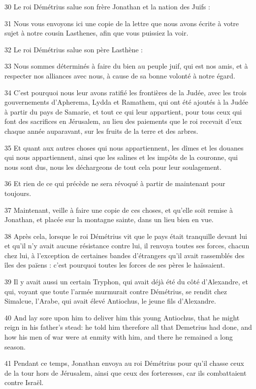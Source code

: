 \par 30 Le roi Démétrius salue son frère Jonathan et la nation des Juifs :
\par 31 Nous vous envoyons ici une copie de la lettre que nous avons écrite à votre sujet à notre cousin Lasthenes, afin que vous puissiez la voir.
\par 32 Le roi Démétrius salue son père Lasthène :
\par 33 Nous sommes déterminés à faire du bien au peuple juif, qui est nos amis, et à respecter nos alliances avec nous, à cause de sa bonne volonté à notre égard.
\par 34 C'est pourquoi nous leur avons ratifié les frontières de la Judée, avec les trois gouvernements d'Apherema, Lydda et Ramathem, qui ont été ajoutés à la Judée à partir du pays de Samarie, et tout ce qui leur appartient, pour tous ceux qui font des sacrifices en Jérusalem, au lieu des paiements que le roi recevait d'eux chaque année auparavant, sur les fruits de la terre et des arbres.
\par 35 Et quant aux autres choses qui nous appartiennent, les dîmes et les douanes qui nous appartiennent, ainsi que les salines et les impôts de la couronne, qui nous sont dus, nous les déchargeons de tout cela pour leur soulagement.
\par 36 Et rien de ce qui précède ne sera révoqué à partir de maintenant pour toujours.
\par 37 Maintenant, veille à faire une copie de ces choses, et qu'elle soit remise à Jonathan, et placée sur la montagne sainte, dans un lieu bien en vue.
\par 38 Après cela, lorsque le roi Démétrius vit que le pays était tranquille devant lui et qu'il n'y avait aucune résistance contre lui, il renvoya toutes ses forces, chacun chez lui, à l'exception de certaines bandes d'étrangers qu'il avait rassemblés des îles des païens : c'est pourquoi toutes les forces de ses pères le haïssaient.
\par 39 Il y avait aussi un certain Tryphon, qui avait déjà été du côté d'Alexandre, et qui, voyant que toute l'armée murmurait contre Démétrius, se rendit chez Simalcue, l'Arabe, qui avait élevé Antiochus, le jeune fils d'Alexandre.
\par 40 And lay sore upon him to deliver him this young Antiochus, that he might reign in his father's stead: he told him therefore all that Demetrius had done, and how his men of war were at enmity with him, and there he remained a long season.
\par 41 Pendant ce temps, Jonathan envoya au roi Démétrius pour qu'il chasse ceux de la tour hors de Jérusalem, ainsi que ceux des forteresses, car ils combattaient contre Israël.
